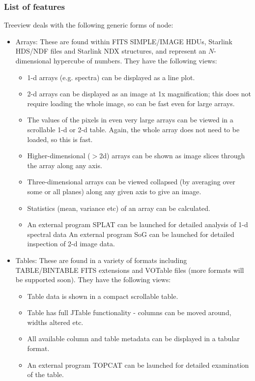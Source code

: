 \documentclass[twoside,11pt]{article}
\newcommand{\xlabel}[1]{}
\renewcommand{\_}{\texttt{\symbol{95}}}
\begin{document}
\subsubsection{\label{features}\xlabel{features}List of features}

Treeview deals with the following generic forms of node:

\begin{itemize}
\item Arrays:
      These are found within FITS SIMPLE/IMAGE HDUs, Starlink HDS/NDF files
      and Starlink NDX structures, and represent an $N$-dimensional hypercube 
      of numbers. They have the following views:

\begin{itemize}
\item 1-d arrays (e.g. spectra) can be displayed as a line plot.
\item 2-d arrays can be displayed as an image at 1x magnification; this 
      does not require loading the whole image, so can be fast even for 
      large arrays.
\item The values of the pixels in even very large arrays can be viewed in a 
      scrollable 1-d or 2-d table. Again, the whole array does not need to be 
      loaded, so this is fast.
\item Higher-dimensional ($>$2d) arrays can be shown as image slices through the 
      array along any axis.
\item Three-dimensional arrays can be viewed collapsed (by averaging over some or 
      all planes) along any given axis to give an image.
\item Statistics (mean, variance etc) of an array can be calculated.
\item An external program SPLAT can be launched for detailed analysis of 1-d spectral data An 
      external program SoG can be launched for detailed inspection of 2-d image
      data. 
\end{itemize}

\item Tables: These are found in a variety of formats including TABLE/BINTABLE
      FITS extensions and VOTable files (more formats will be supported soon). 
      They have the following views:

\begin{itemize}
 \item Table data is shown in a compact scrollable table.
 \item Table has full JTable functionality - columns can be moved around,
       widths altered etc.
 \item All available column and table metadata can be displayed in a tabular
       format.
 \item An external program TOPCAT can be launched for detailed examination of
       the table. 
\end{itemize}


\end{itemize}
\end{document}
